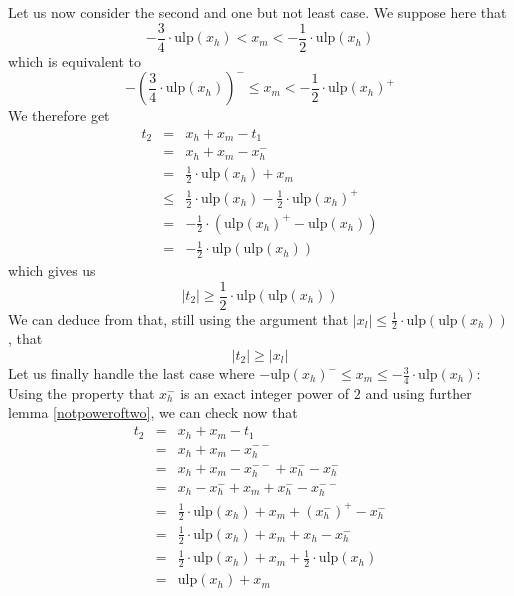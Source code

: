 \documentclass[a4paper,10pt,twoside]{article}
\newenvironment{proof}[1][Proof]{\begin{trivlist}
\item[\hskip \labelsep {\bfseries #1}]}{\end{trivlist}}
\newcommand{\hi}{\ensuremath{\mathit{h}}}
\newcommand{\mi}{\ensuremath{\mathit{m}}}
\newcommand{\lo}{\ensuremath{\mathit{l}}}
\newcommand{\mUlp}{\ensuremath{\mathrm{ulp}}}
\begin{document}
\begin{proof}
Let us now consider the second and one but not least case. We suppose here that
$$-\frac{3}{4} \cdot \mUlp\left( x_\hi \right) < x_\mi < -\frac{1}{2} \cdot \mUlp\left( x_\hi \right)$$
which is equivalent to 
$$-\left(\frac{3}{4} \cdot \mUlp\left( x_\hi \right)\right)^- \leq x_\mi < -\frac{1}{2} \cdot \mUlp\left( x_\hi \right)^+$$
We therefore get
\begin{eqnarray*}
t_2 &= & x_\hi + x_\mi - t_1 \\
& = & x_\hi + x_\mi - x_\hi^- \\
& = & \frac{1}{2} \cdot \mUlp\left( x_\hi \right) + x_\mi \\
& \leq & \frac{1}{2} \cdot \mUlp\left( x_\hi \right) - \frac{1}{2} \cdot \mUlp\left( x_\hi \right)^+ \\
& = & -\frac{1}{2} \cdot \left( \mUlp\left( x_\hi \right)^+ - \mUlp\left( x_\hi \right) \right) \\
& = & -\frac{1}{2} \cdot \mUlp\left( \mUlp\left( x_\hi \right) \right)
\end{eqnarray*}
which gives us
$$\left \vert t_2 \right \vert \geq \frac{1}{2} \cdot \mUlp\left( \mUlp\left( x_\hi \right) \right)$$
We can deduce from that, still using the argument that 
$\left \vert x_\lo \right \vert \leq \frac{1}{2} \cdot \mUlp\left( \mUlp \left( x_\hi \right) \right)$, that
$$\left \vert t_2 \right \vert \geq \left \vert x_\lo \right \vert $$
Let us finally handle the last case where $-\mUlp\left( x_\hi \right)^- \leq x_\mi \leq - \frac{3}{4} \cdot \mUlp\left( x_\hi \right)$: \\
Using the property that $x_\hi^-$ is an exact integer power of $2$ and using further 
lemma \ref{notpoweroftwo}, we can check now that
\begin{eqnarray*}
t_2 & = & x_\hi + x_\mi - t_1 \\
& = & x_\hi + x_\mi - x_\hi^{--} \\
& = & x_\hi + x_\mi - x_\hi^{--} + x_\hi^- - x_\hi^- \\
& = & x_\hi - x_\hi^- + x_\mi + x_\hi^- - x_\hi^{--} \\
& = & \frac{1}{2} \cdot \mUlp\left( x_\hi \right) + x_\mi + \left( x_\hi^- \right)^+ - x_\hi^- \\
& = & \frac{1}{2} \cdot \mUlp\left( x_\hi \right) + x_\mi + x_\hi - x_\hi^- \\
& = & \frac{1}{2} \cdot \mUlp\left( x_\hi \right) + x_\mi + \frac{1}{2} \cdot \mUlp\left( x_\hi \right) \\
& = & \mUlp\left( x_\hi \right) + x_\mi \\

\end{eqnarray*}
\end{proof}
\end{document}

